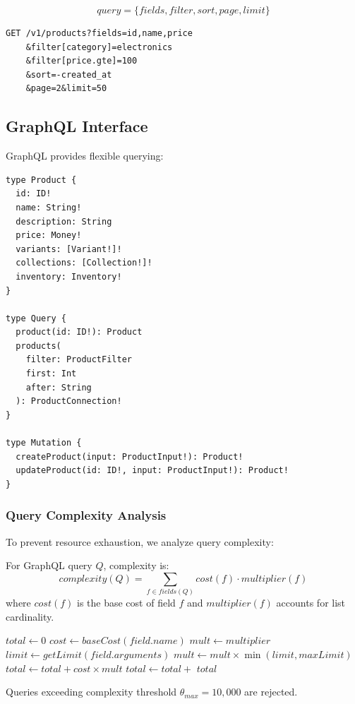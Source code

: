 \begin{equation}
query = \{fields, filter, sort, page, limit\}
\end{equation}

\begin{lstlisting}[caption=REST Query Example]
GET /v1/products?fields=id,name,price
    &filter[category]=electronics
    &filter[price.gte]=100
    &sort=-created_at
    &page=2&limit=50
\end{lstlisting}

\subsection{GraphQL Interface}

GraphQL provides flexible querying:

\begin{lstlisting}[caption=GraphQL Schema Excerpt]
type Product {
  id: ID!
  name: String!
  description: String
  price: Money!
  variants: [Variant!]!
  collections: [Collection!]!
  inventory: Inventory!
}

type Query {
  product(id: ID!): Product
  products(
    filter: ProductFilter
    first: Int
    after: String
  ): ProductConnection!
}

type Mutation {
  createProduct(input: ProductInput!): Product!
  updateProduct(id: ID!, input: ProductInput!): Product!
}
\end{lstlisting}

\subsubsection{Query Complexity Analysis}

To prevent resource exhaustion, we analyze query complexity:

\begin{definition}
For GraphQL query $Q$, complexity is:
\begin{equation}
complexity(Q) = \sum_{f \in fields(Q)} cost(f) \cdot multiplier(f)
\end{equation}
where $cost(f)$ is the base cost of field $f$ and $multiplier(f)$ accounts for list cardinality.
\end{definition}

\begin{algorithm}
\caption{GraphQL Complexity Analysis}
\begin{algorithmic}[1]
    \State $total \gets 0$
        \State $cost \gets baseCost(field.name)$
        \State $mult \gets multiplier$
            \State $limit \gets getLimit(field.arguments)$
            \State $mult \gets mult \times \min(limit, maxLimit)$
        \EndIf
        \State $total \gets total + cost \times mult$
            \State $total \gets total +$ 
        \EndIf
    \EndFor
    \State \Return $total$
\EndFunction
\end{algorithmic}
\end{algorithm}

Queries exceeding complexity threshold $\theta_{max} = 10,000$ are rejected.

